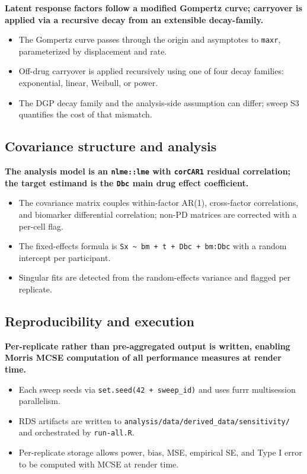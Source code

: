 \documentclass[
  11pt,
]{article}
\begin{document}
\textbf{Latent response factors follow a modified Gompertz curve; carryover is applied via a recursive decay from an extensible decay-family.}

\begin{itemize}\setlength{\itemsep}{2pt}\setlength{\parskip}{0pt}
\item The Gompertz curve passes through the origin and asymptotes to \texttt{maxr}, parameterized by displacement and rate.
\item Off-drug carryover is applied recursively using one of four decay families: exponential, linear, Weibull, or power.
\item The DGP decay family and the analysis-side assumption can differ; sweep S3 quantifies the cost of that mismatch.
\end{itemize}

\subsection{Covariance structure and analysis}\label{covariance-structure-and-analysis}

\textbf{The analysis model is an \texttt{nlme::lme} with \texttt{corCAR1} residual correlation; the target estimand is the \texttt{Dbc} main drug effect coefficient.}

\begin{itemize}\setlength{\itemsep}{2pt}\setlength{\parskip}{0pt}
\item The covariance matrix couples within-factor AR(1), cross-factor correlations, and biomarker differential correlation; non-PD matrices are corrected with a per-cell flag.
\item The fixed-effects formula is \texttt{Sx \textasciitilde{} bm + t + Dbc + bm:Dbc} with a random intercept per participant.
\item Singular fits are detected from the random-effects variance and flagged per replicate.
\end{itemize}

\subsection{Reproducibility and execution}\label{reproducibility-and-execution}

\textbf{Per-replicate rather than pre-aggregated output is written, enabling Morris MCSE computation of all performance measures at render time.}

\begin{itemize}\setlength{\itemsep}{2pt}\setlength{\parskip}{0pt}
\item Each sweep seeds via \texttt{set.seed(42 + sweep\_id)} and uses furrr multisession parallelism.
\item RDS artifacts are written to \texttt{analysis/data/derived\_data/sensitivity/} and orchestrated by \texttt{run-all.R}.
\item Per-replicate storage allows power, bias, MSE, empirical SE, and Type I error to be computed with MCSE at render time.
\end{itemize}
\end{document}
